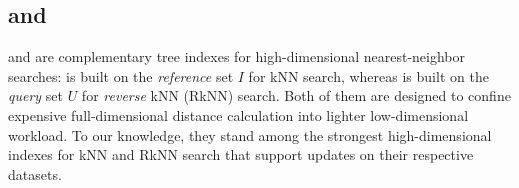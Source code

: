 \subsection{\hdrtree and \deltatree}
\deltatree \cite{cui2003contorting} and \hdrtree \cite{yang2014continuous} are complementary tree indexes for high-dimensional nearest-neighbor searches:
\deltatree is built on the \emph{reference} set $I$ for kNN search, whereas \hdrtree is built on the \emph{query} set $U$ for \emph{reverse} kNN (RkNN) search.
Both of them are designed to confine expensive full-dimensional distance calculation into lighter low-dimensional workload. To our knowledge, they stand among the strongest high-dimensional indexes for kNN and RkNN search that support updates on their respective datasets.

